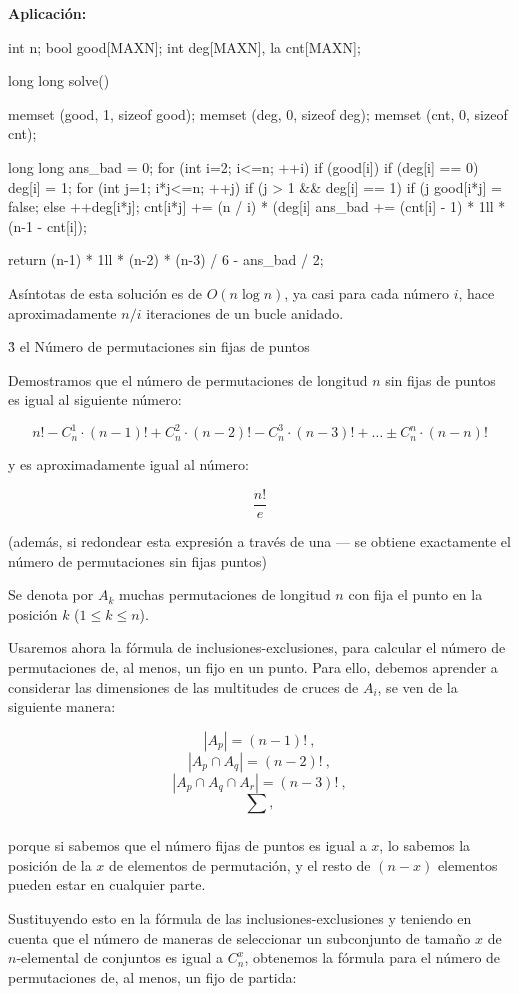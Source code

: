 \bf{Aplicación}:

\code
int n;
bool good[MAXN];
int deg[MAXN], la cnt[MAXN];

long long solve() {
memset (good, 1, sizeof good);
memset (deg, 0, sizeof deg);
memset (cnt, 0, sizeof cnt);

long long ans_bad = 0;
for (int i=2; i<=n; ++i) {
if (good[i]) {
if (deg[i] == 0) deg[i] = 1;
for (int j=1; i*j<=n; ++j) {
if (j > 1 && deg[i] == 1)
if (j %
good[i*j] = false;
else
++deg[i*j];
cnt[i*j] += (n / i) * (deg[i]%
}
}
ans_bad += (cnt[i] - 1) * 1ll * (n-1 - cnt[i]);
}

return (n-1) * 1ll * (n-2) * (n-3) / 6 - ans_bad / 2;
}
\endcode

Asíntotas de esta solución es de $O (n \log n)$, ya casi para cada número $i$, hace aproximadamente $n/i$ iteraciones de un bucle anidado.


\h3{ el Número de permutaciones sin fijas de puntos }

Demostramos que el número de permutaciones de longitud $n$ sin fijas de puntos es igual al siguiente número:

$$ n! - C_n^1 \cdot (n-1)! + C_n^2 \cdot (n-2)! - C_n^3 \cdot (n-3)! + \ldots \pm C_n^n \cdot (n-n)! $$

y es aproximadamente igual al número:

$$ \frac{ n! }{ e } $$

(además, si redondear esta expresión a través de una --- se obtiene exactamente el número de permutaciones sin fijas puntos)

Se denota por $A_k$ muchas permutaciones de longitud $n$ con fija el punto en la posición $k$ ($1 \le k \le n$).

Usaremos ahora la fórmula de inclusiones-exclusiones, para calcular el número de permutaciones de, al menos, un fijo en un punto. Para ello, debemos aprender a considerar las dimensiones de las multitudes de cruces de $A_i$, se ven de la siguiente manera:

$$ \left| A_p \right| = (n-1)! ~, $$
$$ \left| A_p \cap A_q \right| = (n-2)! ~, $$
$$ \left| A_p \cap A_q \cap A_r \right| = (n-3)! ~, $$
$$ \sum_ ~, $$

porque si sabemos que el número fijas de puntos es igual a $x$, lo sabemos la posición de la $x$ de elementos de permutación, y el resto de $(n-x)$ elementos pueden estar en cualquier parte.

Sustituyendo esto en la fórmula de las inclusiones-exclusiones y teniendo en cuenta que el número de maneras de seleccionar un subconjunto de tamaño $x$ de $n$-elemental de conjuntos es igual a $C_n^x$, obtenemos la fórmula para el número de permutaciones de, al menos, un fijo de partida:

